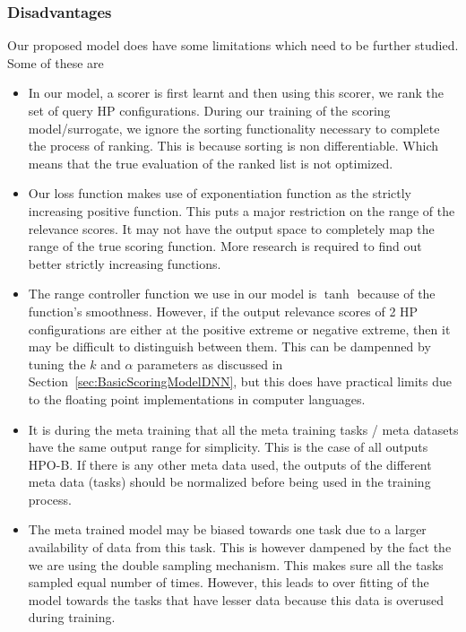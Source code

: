 \documentclass[12pt, twoside, ngerman]{report}
\begin{document}
\subsubsection{Disadvantages}
Our proposed model does have some limitations which need to be further studied.
Some of these are
\begin{itemize}
\item In our model,  a scorer is first learnt and then using this scorer,  we rank the set of query HP configurations.
During our training of the scoring model/surrogate,  we ignore the sorting functionality necessary to complete the process of ranking.
This is because sorting is non differentiable. 
Which means that the true evaluation of the ranked list is not optimized.

\item Our loss function makes use of exponentiation function as the strictly increasing positive function.
This puts a major restriction on the range of the relevance scores.
It may not have the output space to completely map the range of the true scoring function.
More research is required to find out better strictly increasing functions.

\item The range controller function we use in our model is $\tanh$ because of the function's smoothness.
However,  if the output relevance scores of 2 HP configurations are either at the positive extreme or negative extreme,  then it may be difficult to distinguish between them.
This can be dampenned by tuning the $k$ and $\alpha$ parameters as discussed in Section~\ref{sec:BasicScoringModelDNN},  but this does have practical limits due to the floating point implementations in computer languages.

\item It is during the meta training that all the meta training tasks / meta datasets have the same output range for simplicity.
This is the case of all outputs HPO-B.
If there is any other meta data used,  the outputs of the different meta data (tasks) should be normalized before being used in the training process.

\item The meta trained model may be biased towards one task due to a larger availability of data from this task.
This is however dampened by the fact the we are using the double sampling mechanism.
This makes sure all the tasks sampled equal number of times.
However,  this leads to over fitting of the model towards the tasks that have lesser data because this data is overused during training.

\end{itemize}
    
\end{document}
